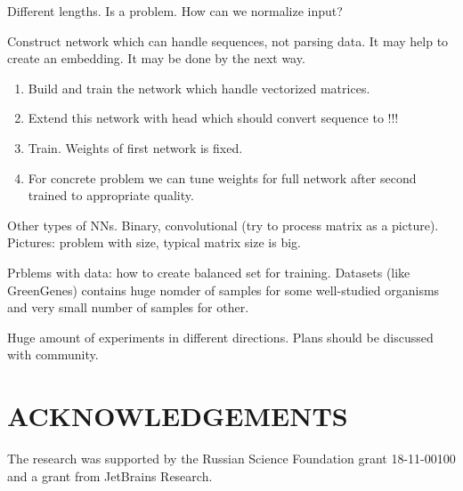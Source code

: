 \documentclass[a4paper,twoside]{article}
\begin{document}
Different lengths. Is a problem.
How can we normalize input?

Construct network which can handle sequences, not parsing data.
It may help to create an embedding.
It may be done by the next way.
\begin{enumerate}
\item Build and train the network which handle vectorized matrices.
\item Extend this network with head which should convert sequence to !!!
\item Train. Weights of first network is fixed.
\item For concrete problem we can tune weights for full network after second trained to appropriate quality.
\end{enumerate}

Other types of NNs.
Binary, convolutional (try to process matrix as a picture).
Pictures: problem with size, typical matrix size is big.

Prblems with data: how to create balanced set for training.
Datasets (like GreenGenes) contains huge nomder of samples for some well-studied organisms and very small number of samples for other.

Huge amount of experiments in different directions.
Plans should be discussed with community.


\section*{\uppercase{Acknowledgements}}

\noindent The research was supported by the Russian Science Foundation grant 18-11-00100 and a grant from JetBrains Research.


\vfill

{\small
}


\vfill
\end{document}

